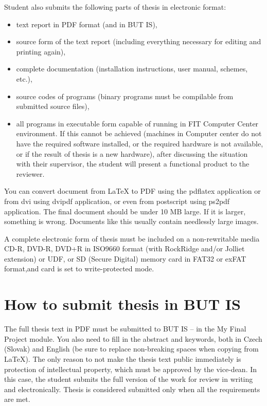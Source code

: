 Student also submits the following parts of thesis in electronic format:
\begin{itemize}
  \item{text report in PDF format (and in BUT IS),}
  \item{source form of the text report (including everything necessary for editing and printing again),}
  \item{complete documentation (installation instructions, user manual, schemes, etc.),}
  \item{source codes of programs (binary programs must be compilable from submitted source files),}
  \item{all programs in executable form capable of running in FIT Computer Center environment. If this cannot be achieved (machines in Computer center do not have the required software installed, or the required hardware is not available, or if the result of thesis is a new hardware), after discussing the situation with their supervisor, the student will present a functional product to the reviewer.}
\end{itemize}

You can convert document from LaTeX to PDF using the pdflatex application or from dvi using dvipdf application, or even from postscript using ps2pdf application. The final document should be under 10 MB large. If it is larger, something is wrong. Documents like this usually contain needlessly large images.

A complete electronic form of thesis must be included on a non-rewritable media CD-R, DVD-R, DVD+R in ISO9660 format (with RockRidge and/or Jolliet extension) or UDF, or SD (Secure Digital) memory card in FAT32 or exFAT format,and card is set to write-protected mode.


\section{How to submit thesis in BUT IS}
The full thesis text in PDF must be submitted to BUT IS -- in the My Final Project module. You also need to fill in the abstract and keywords, both in Czech (Slovak) and English (be sure to replace non-breaking spaces when copying from \LaTeX{}). The only reason to not make the thesis text public immediately is protection of intellectual property, which must be approved by the vice-dean. In this case, the student submits the full version of the work for review in writing and electronically. Thesis is considered submitted only when all the requirements are met.

